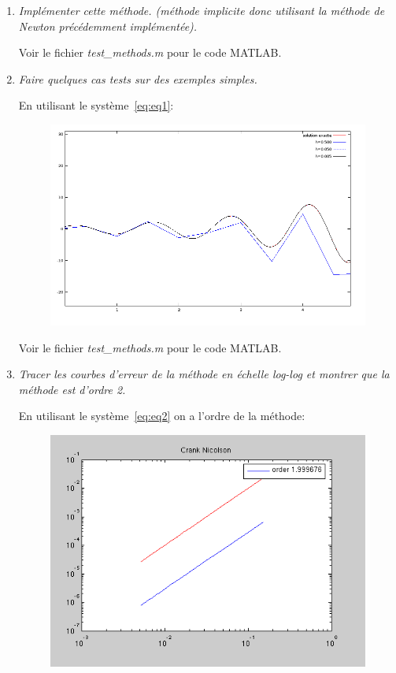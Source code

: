 \documentclass[a4paper,10pt]{article}
\begin{document}
\begin{enumerate}
    \item \emph{Implémenter cette méthode. (méthode implicite donc utilisant la
    méthode de Newton précédemment implémentée).}

    Voir le fichier \emph{test\_methods.m} pour le code MATLAB.

    \item \emph{Faire quelques cas tests sur des exemples simples.}

    En utilisant le système~\eqref{eq:eq1}:
\begin{figure}[h!]
    \centering
    \includegraphics[scale=0.6]{./img/step-crank-nicolson.png}
\end{figure}

    Voir le fichier \emph{test\_methods.m} pour le code MATLAB.
\clearpage
    \item \emph{Tracer les courbes d'erreur de la méthode en échelle log-log et montrer
    que la méthode est d'ordre 2.}

    En utilisant le système~\eqref{eq:eq2} on a l'ordre de la méthode:
\begin{figure}[h!]
    \centering
    \includegraphics[scale=0.5]{./img/order-crank-nicolson.png}
\end{figure}


\end{enumerate}
\end{document}
